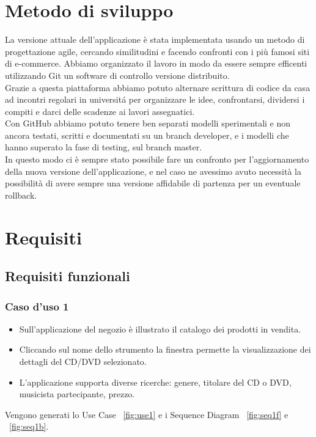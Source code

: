 \documentclass[a4paper,titlepage]{book}
\begin{document}
\chapter{Metodo di sviluppo}
La versione attuale dell'applicazione \`e stata implementata usando un metodo di progettazione agile, cercando similitudini e 
facendo confronti con i pi\`u famosi siti di e-commerce. Abbiamo organizzato il lavoro in modo da essere sempre efficenti utilizzando Git un software di controllo versione distribuito.\\
Grazie a questa piattaforma abbiamo potuto alternare scrittura di codice da casa ad incontri regolari in universit\'a per organizzare
le idee, confrontarsi, dividersi i compiti e darci delle scadenze ai lavori assegnatici.\\
Con GitHub abbiamo potuto tenere ben separati modelli sperimentali e non ancora testati, scritti e documentati su un branch developer, e i modelli che hanno superato la fase di testing, sul branch master.\\
In questo modo ci \`e sempre stato possibile fare un confronto per l'aggiornamento della nuova versione dell'applicazione,
e nel caso ne avessimo avuto necessit\`a la possibilit\`a di avere sempre una versione affidabile di partenza per un eventuale rollback.

\chapter{Requisiti}
\section{Requisiti funzionali}
\subsection{Caso d'uso 1}
\begin{itemize}
\item Sull'applicazione del negozio \`e illustrato il catalogo dei prodotti in vendita.
\item Cliccando sul nome dello strumento la finestra permette la visualizzazione dei dettagli del CD/DVD selezionato.
\item L'applicazione supporta diverse ricerche: genere, titolare del CD o DVD, musicista partecipante, prezzo.
\end{itemize}
Vengono generati lo Use Case \figurename~\ref{fig:use1} e i Sequence Diagram \figurename~\ref{fig:seq1f} e \figurename~\ref{fig:seq1b}.
\end{document}
